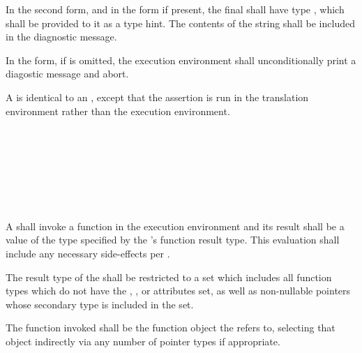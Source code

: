 \specsubsubitem
In the second  form, and in the  form if
present, the final  shall have type ,
which shall be provided to it as a type hint. The contents of the string shall
be included in the diagnostic message.

\specsubsubitem
In the  form, if  is omitted, the execution
environment shall unconditionally print a diagostic message and abort.

\specsubsubitem
A  is identical to an
, except that the assertion is run in the
translation environment rather than the execution environment.


\begin{grammar}
 \\
	 \terminal{(}  \terminal{)} \\

 \\
	 \optional{\terminal{,}} \\
	  \optional{\terminal{,}} \\
	 \terminal{,}  \\
\end{grammar}

\specsubsubitem
A  shall invoke a function in the execution
environment and its result shall be a value of the type specified by the
's function result type. This evaluation shall
include any necessary side-effects per .

\specsubsubitem
The result type of the  shall be restricted to a
set which includes all function types which do not have the ,
, or  attributes set, as well as non-nullable
pointers whose secondary type is included in the set.


\specsubsubitem
The function invoked shall be the function object the
 refers to, selecting that object indirectly via
any number of pointer types if appropriate.

